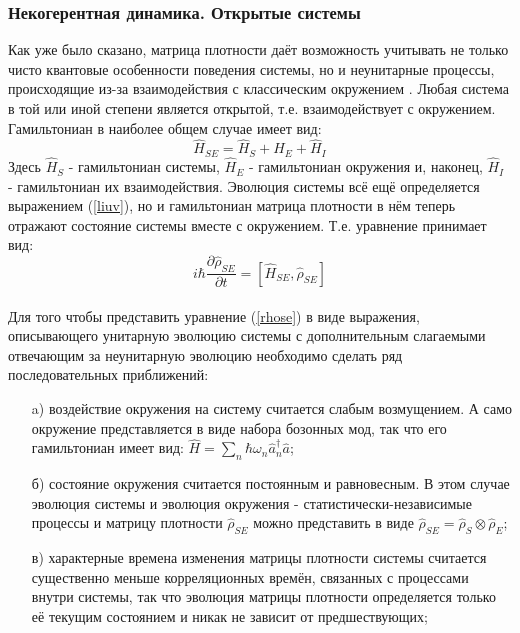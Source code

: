 \subsubsection{Некогерентная динамика. Открытые системы}\label{neun}
Как уже было сказано, матрица плотности даёт возможность учитывать не только чисто квантовые особенности поведения системы, но и неунитарные процессы, происходящие из-за взаимодействия с классическим окружением \cite{Budini2009,Talkner2009}. Любая система в той или иной степени является открытой, т.е. взаимодействует с окружением. Гамильтониан в наиболее общем случае имеет вид:
\begin{equation}
\tag{17}
\hat H_{SE} = \hat H_S + \hat H_E + \hat H_I 
\end{equation} 	
Здесь $\hat H_S$ - гамильтониан системы, $\hat H_E$ - гамильтониан окружения и, наконец, $\hat H_I$ - гамильтониан их взаимодействия. Эволюция системы всё ещё определяется выражением (\ref{liuv}), но и гамильтониан матрица плотности в нём теперь отражают состояние системы вместе с окружением. Т.е. уравнение принимает вид:
\begin{equation}
\tag{18}
\label{rhose}
i\hbar\frac{\partial\hat\rho_{SE}}{\partial t}= [\hat H_{SE},\hat\rho_{SE}]
\end{equation}
\\

Для того чтобы представить уравнение (\ref{rhose}) в виде выражения, описывающего унитарную эволюцию системы с дополнительным слагаемыми отвечающим за неунитарную эволюцию необходимо сделать ряд последовательных приближений:
\begin{itemize}
	\item [a)] воздействие окружения на систему считается слабым возмущением. А само окружение представляется в виде набора бозонных мод, так что его гамильтониан имеет вид: $\hat H = \sum_n \hbar\omega_n \hat a^\dagger_n\hat a$;
	\item [б)] состояние окружения считается постоянным и равновесным. В этом случае эволюция системы и эволюция окружения - статистически-независимые процессы и матрицу плотности $\hat \rho_{SE}$ можно представить в виде $\hat \rho_{SE} = \hat \rho_{S}\otimes\hat\rho_E$;
	\item[в)] характерные времена изменения матрицы плотности системы считается существенно меньше  корреляционных времён, связанных с процессами внутри системы, так что эволюция матрицы плотности определяется только её текущим состоянием и никак не зависит от предшествующих; 
\end{itemize}	

